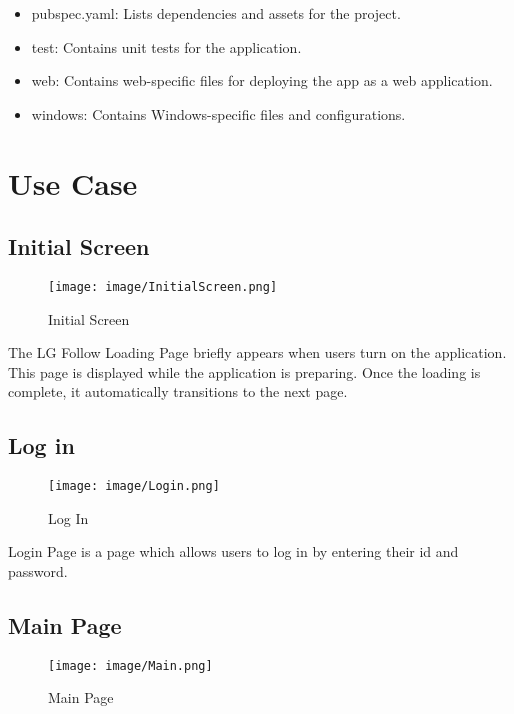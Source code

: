 \documentclass[conference]{IEEEtran}
\begin{document}
\begin{itemize}
    \item pubspec.yaml: Lists dependencies and assets for the project. \\
    \item test: Contains unit tests for the application. \\
    \item web: Contains web-specific files for deploying the app as a web application. \\
    \item windows: Contains Windows-specific files and configurations. \\
\end{itemize}

\section{Use Case}

\subsection{Initial Screen}
\begin{figure}[h!]
    \centering
    \texttt{[image: image/InitialScreen.png]}
    \caption{Initial Screen}
    \label{fig:enter-label}
\end{figure}

\noindent The LG Follow Loading Page briefly appears when users turn on the application. This page is displayed while the application is preparing. Once the loading is complete, it automatically transitions to the next page.\\


\subsection{Log in}
\begin{figure}[h!]
    \centering
    \texttt{[image: image/Login.png]}
    \caption{Log In}
    \label{fig:enter-label}
\end{figure}

\noindent Login Page is a page which allows users to log in by entering their id and password.\\


\subsection{Main Page}

\begin{figure}[h!]
    \centering
    \texttt{[image: image/Main.png]}
    \caption{Main Page}
    \label{fig:enter-label}
\end{figure}
\end{document}
